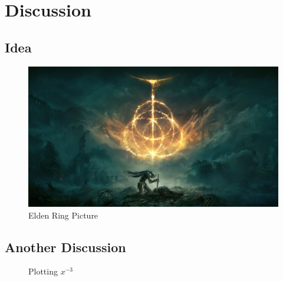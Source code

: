 \section{Discussion}

\subsection{Idea}

\blindtext

\begin{figure}[H]
    \centering
    \includegraphics[width=0.9\linewidth]{figures/elden ring.jpg}
    \caption{Elden Ring Picture}
    \label{fig:hero}
\end{figure}

\subsection{Another Discussion}

\blindtext

\begin{figure}[H]
    \centering
    \caption{Plotting $x^{-3}$}
\end{figure}
